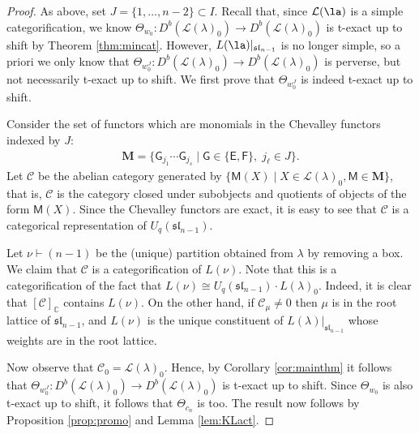 \documentclass[11pt,reqno]{amsart}
\numberwithin{equation}{section}
\theoremstyle{definition}
\theoremstyle{named}
\newcommand{\cC}{\mathcal{C}}
\newcommand{\sE}{\mathsf{E}}
\newcommand{\sF}{\mathsf{F}}
\newcommand{\sG}{\mathsf{G}}
\newcommand{\cL}{\mathcal{L}}
\newcommand{\bM}{\mathbf{M}}
\newcommand{\sM}{\mathsf{M}}
\newcommand{\CC}{\mathbb{C}}
\newcommand{\fsl}{\mathfrak{sl}}
\begin{document}
\begin{proof}
As above, set $J=\{1,\hdots,n-2\} \subset I$.  Recall that, since $\cL(\la)$ is a simple categorification, we know  $\Theta_{w_0}:D^b( \cL(\lambda)_0) \to D^b( \cL(\lambda)_0)$ is t-exact up to shift by Theorem \ref{thm:mincat}. However, $L(\la)|_{\fsl_{n-1}}$ is no longer simple, so a priori we only know that $\Theta_{w_0^J}:D^b( \cL(\lambda)_0) \to D^b( \cL(\lambda)_0)$ is perverse, but not necessarily t-exact up to shift.
We first prove that $\Theta_{w_0^J}$ is indeed t-exact up to shift.  

Consider the set of functors which are monomials in the Chevalley functors indexed by $J$:
\begin{align*}
\bM=\{\sG_{j_1}\cdots \sG_{j_s}\;|\; \sG \in \{\sE,\sF \},\;  j_\ell \in J \}.
\end{align*}
Let $\cC$ be the abelian category generated by $\{\sM(X)\;|\; X \in \cL(\lambda)_0,\sM \in \bM\}$, that is, $\cC$ is the category closed under subobjects and quotients of objects of the form $\sM(X)$.  Since the Chevalley functors are exact, it is easy to see that $\cC$ is a categorical representation of $U_q(\fsl_{n-1})$.  

Let $\nu \vdash (n-1)$ be the (unique) partition obtained from $\lambda$ by removing a box.  We claim that $\cC$ is a categorification of $L(\nu)$.  Note that this is  a categorification of the fact that $L(\nu) \cong U_q(\fsl_{n-1})\cdot L(\lambda)_0$.  Indeed, it is clear that $[\cC]_\CC$ contains $L(\nu)$.  On the other hand, if $\cC_\mu\neq0$ then $\mu$ is in the root lattice of $\fsl_{n-1}$, and $L(\nu)$ is the unique constituent of $L(\lambda)|_{\fsl_{n-1}}$ whose weights are in the root lattice.  

Now observe that $\cC_0=\cL(\lambda)_0$. Hence, by Corollary \ref{cor:mainthm} it follows that $\Theta_{w_0^J}:D^b( \cL(\lambda)_0) \to D^b( \cL(\lambda)_0)$ is t-exact up to shift.  Since $\Theta_{w_0}$ is also t-exact up to shift, it follows that $\Theta_{c_n}$ is too.  The result now follows by Proposition \ref{prop:promo} and Lemma \ref{lem:KLact}.
\end{proof}
\end{document}
